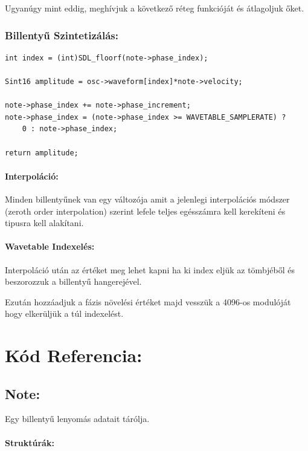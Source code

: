 \documentclass{article}
\begin{document}
Ugyanúgy mint eddig, meghívjuk a következő réteg funkcióját 
és átlagoljuk őket.

\subsubsection{Billentyű Szintetizálás:}
\begin{lstlisting}[caption={
    \code{synthesize_note()} funkció belseje
}]
int index = (int)SDL_floorf(note->phase_index);

Sint16 amplitude = osc->waveform[index]*note->velocity;

note->phase_index += note->phase_increment;
note->phase_index = (note->phase_index >= WAVETABLE_SAMPLERATE) ? 
    0 : note->phase_index;

return amplitude;
\end{lstlisting}

\paragraph{Interpoláció:}
Minden billentyűnek van egy  változója 
amit a jelenlegi interpolációs módszer (zeroth order interpolation) 
szerint lefele teljes egésszámra kell kerekíteni és  
tipusra kell alakítani.

\paragraph{Wavetable Indexelés:}
Interpoláció után az  értéket meg lehet kapni
ha ki index eljük az  tömbjéből és beszorozzuk
a billentyű hangerejével.

Ezután hozzáadjuk a fázis növelési értéket majd vesszük a 4096-os 
modulóját hogy elkerüljük a túl indexelést.

\appendix
\section{Kód Referencia:}

\subsection{Note:}
Egy billentyű lenyomás adatait tárólja.

\paragraph{Struktúrák:}
\end{document}
